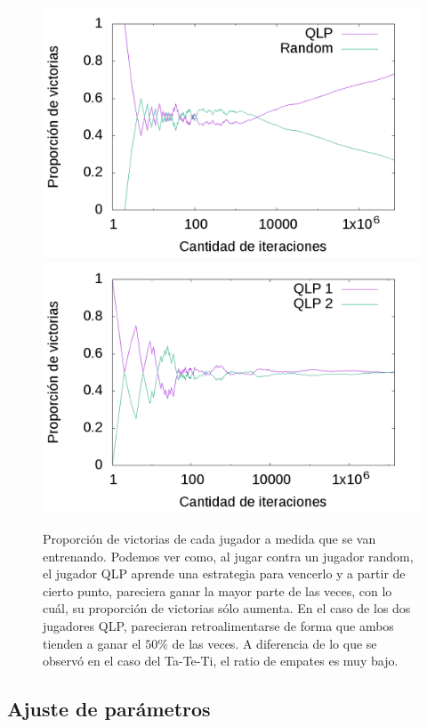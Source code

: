 \documentclass[10pt, a4paper]{article}
\begin{document}
\begin{figure}[H]
  \begin{minipage}[c]{1\textwidth}
	\includegraphics[scale=0.2]{Initial/QvR.png}
	\includegraphics[scale=0.2]{Initial/QvQ.png}
  \end{minipage}
  \caption{Proporción de victorias de cada jugador a medida que se van entrenando. Podemos ver como, al jugar contra un jugador random, el jugador QLP aprende una estrategia para vencerlo y a partir de cierto punto, pareciera ganar la mayor parte de las veces, con lo cuál, su proporción de victorias sólo aumenta. En el caso de los dos jugadores QLP, parecieran retroalimentarse de forma que ambos tienden a ganar el $50\%$ de las veces. A diferencia de lo que se observó en el caso del Ta-Te-Ti, el ratio de empates es muy bajo.}
\end{figure}


\subsection{Ajuste de parámetros}
\end{document}
